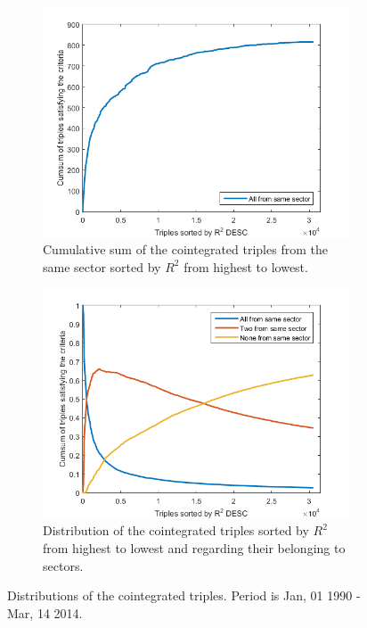 \documentclass[11pt,a4,twosided,singlespacing,titlepagenumber=on]{scrreprt}
\numberwithin{equation}{chapter} %
\theoremstyle{remark}
\begin{document}
\begin{figure}[H]
    \centering
    \begin{subfigure}[t]{0.46\textwidth}
        \centering
        \includegraphics[width=1\textwidth]{triples_sector_0}
        \caption{Cumulative sum of the cointegrated triples from the same sector sorted by $R^2$ from highest to lowest.}
        \label{triples_sector_0}
    \end{subfigure}
    \begin{subfigure}[t]{0.46\textwidth}
        \centering
        \includegraphics[width=1\textwidth]{triples_sector_1}
        \caption{Distribution of the cointegrated triples sorted by $R^2$ from highest to lowest and regarding their belonging to sectors.}
        \label{triples_sector_1}
    \end{subfigure}
    \caption{Distributions of the cointegrated triples. Period is Jan, 01 1990 - Mar, 14 2014.}
\end{figure}
\end{document}

